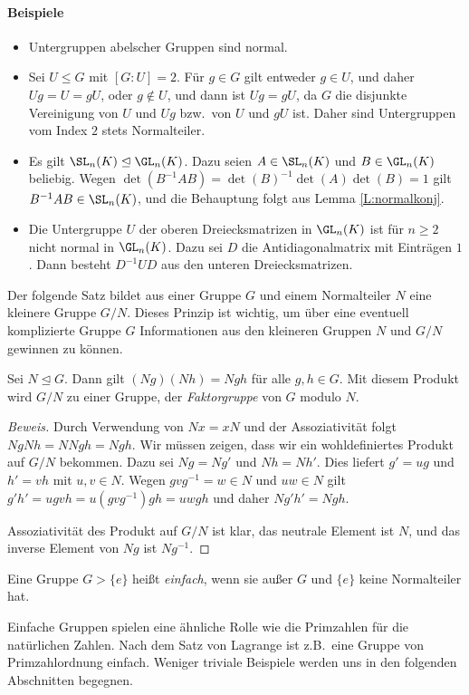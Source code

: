 \documentclass[12pt,a4paper,twoside]{article}
\newcommand{\ei}[1]{\emph{#1}\index{#1}}
\begin{document}
\paragraph{Beispiele}
\begin{itemize}
\item Untergruppen abelscher Gruppen sind normal.
\item Sei $U\le G$ mit $[G:U]=2$. F\"ur $g\in G$ gilt entweder $g\in U$, und
  daher $Ug=U=gU$, oder $g\notin U$, und dann ist $Ug=gU$, da $G$ die disjunkte
  Vereinigung von $U$ und $Ug$ bzw.\ von $U$ und $gU$ ist. Daher sind
  Untergruppen vom Index $2$ stets Normalteiler.
\item Es gilt $\SL_n(K)\trianglelefteq\GL_n(K)$. Dazu seien $A\in\SL_n(K)$ und
  $B\in\GL_n(K)$ beliebig. Wegen $\det(B^{-1}AB)=\det(B)^{-1}\det(A)\det(B)=1$
  gilt $B^{-1}AB\in\SL_n(K)$, und die Behauptung folgt aus Lemma
  \ref{L:normalkonj}.
\item Die Untergruppe $U$ der oberen Dreiecksmatrizen in $\GL_n(K)$ ist f\"ur
  $n\ge2$ nicht normal in $\GL_n(K)$. Dazu sei $D$ die Antidiagonalmatrix mit
  Eintr\"agen $1$. Dann besteht $D^{-1}UD$ aus den unteren Dreiecksmatrizen.
\end{itemize}
Der folgende Satz bildet aus einer Gruppe $G$ und einem Normalteiler $N$ eine
kleinere Gruppe $G/N$. Dieses Prinzip ist wichtig, um \"uber eine eventuell
komplizierte Gruppe $G$ Informationen aus den kleineren Gruppen $N$ und $G/N$
gewinnen zu k\"onnen.
\begin{Satz}
  Sei $N\trianglelefteq G$. Dann gilt $(Ng)(Nh)=Ngh$ f\"ur alle $g,h\in
  G$. Mit diesem Produkt wird $G/N$ zu einer Gruppe, der \ei{Faktorgruppe} von
  $G$ modulo $N$.
\end{Satz}
\begin{proof}[Beweis]
  Durch Verwendung von $Nx=xN$ und der Assoziativit\"at folgt $NgNh=NNgh=Ngh$.
  Wir m\"ussen zeigen, dass wir ein wohldefiniertes Produkt auf $G/N$
  bekommen. Dazu sei $Ng=Ng'$ und $Nh=Nh'$. Dies liefert $g'=ug$ und $h'=vh$
  mit $u,v\in N$. Wegen $gvg^{-1}=w\in N$ und $uw\in N$ gilt
  $g'h'=ugvh=u(gvg^{-1})gh=uwgh$ und daher $Ng'h'=Ngh$.

  Assoziativit\"at des Produkt auf $G/N$ ist klar, das neutrale Element ist
  $N$, und das inverse Element von $Ng$ ist $Ng^{-1}$.
\end{proof}
\begin{Definition}
  Eine Gruppe $G>\{e\}$ hei\ss t \ei{einfach}, wenn sie au\ss er $G$ und
  $\{e\}$ keine Normalteiler hat.
\end{Definition}
Einfache Gruppen spielen eine \"ahnliche Rolle wie die Primzahlen f\"ur die
nat\"urlichen Zahlen. Nach dem Satz von Lagrange ist z.B.\ eine Gruppe von
Primzahlordnung einfach. Weniger triviale Beispiele werden uns in den
folgenden Abschnitten begegnen.
\end{document}
